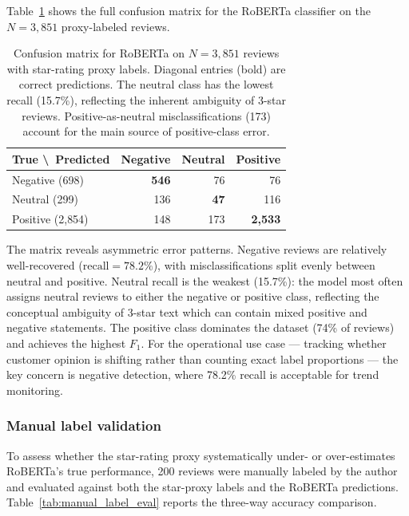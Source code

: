 Table~\ref{tab:roberta_confusion} shows the full confusion matrix for the RoBERTa
classifier on the $N = 3{,}851$ proxy-labeled reviews.

\begin{table}[H]
  \centering
  \begin{tabular}{lrrr}
    \toprule
    \textbf{True \textbackslash\ Predicted} & \textbf{Negative} & \textbf{Neutral} & \textbf{Positive} \\
    \midrule
    Negative (698)   & \textbf{546} & 76  & 76 \\
    Neutral (299)    & 136          & \textbf{47} & 116 \\
    Positive (2{,}854) & 148        & 173 & \textbf{2{,}533} \\
    \bottomrule
  \end{tabular}
  \caption{Confusion matrix for RoBERTa on $N = 3{,}851$ reviews with star-rating proxy labels.
  Diagonal entries (bold) are correct predictions. The neutral class has the lowest recall (15.7\%),
  reflecting the inherent ambiguity of 3-star reviews. Positive-as-neutral misclassifications (173)
  account for the main source of positive-class error.}
  \label{tab:roberta_confusion}
\end{table}

The matrix reveals asymmetric error patterns. Negative reviews are relatively well-recovered
($\text{recall} = 78.2\%$), with misclassifications split evenly between neutral and positive.
Neutral recall is the weakest (15.7\%): the model most often assigns neutral reviews to either
the negative or positive class, reflecting the conceptual ambiguity of 3-star text which can
contain mixed positive and negative statements. The positive class dominates the dataset (74\% of
reviews) and achieves the highest $F_1$. For the operational use case --- tracking whether
customer opinion is shifting rather than counting exact label proportions --- the key concern is
negative detection, where 78.2\% recall is acceptable for trend monitoring.

\subsubsection*{Manual label validation}

To assess whether the star-rating proxy systematically under- or over-estimates
RoBERTa's true performance, 200 reviews were manually labeled by the author and
evaluated against both the star-proxy labels and the RoBERTa predictions.
Table~\ref{tab:manual_label_eval} reports the three-way accuracy comparison.

